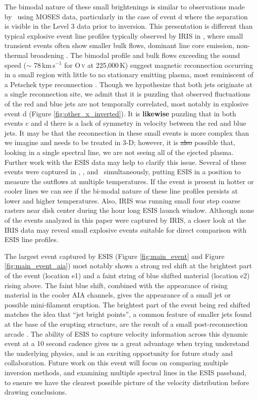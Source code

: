 \documentclass[linenumbers,trackchanges]{aastex63}
\begin{document}
	The bimodal nature of these small brightenings is similar to observations made by \citet{Rust2019} \heii \ using MOSES data, particularly in the case of event d where the separation is visible in the Level 3 data prior to inversion.
	This presentation is different than typical explosive event line profiles typically observed by IRIS in \siiv, where small transient events often show smaller bulk flows, dominant line core emission, non-thermal broadening \citep{Innes2015,Chitta2017}. 
	The bimodal profile and bulk flows exceeding the sound speed ($\sim$ 78\,km\,s$^{-1}$ for O\,\textsc{v} at 225,000\,K) suggest magnetic reconnection occurring in a small region with little to no stationary emitting plasma, most reminiscent of a Petschek type reconnection \citep{Innes1999}.
	Though we hypothesize that both jets originate at a single reconnection site, we admit that it is puzzling that observed fluctuations of the red and blue jets are not temporally correlated, most notably in explosive event d (Figure \ref{fig:other_x_inverted}).
    It is \textbf{likewise} puzzling that in both events c and d there is a lack of symmetry in velocity between the red and blue jets.
	It may be that the reconnection in these small events is more complex than we imagine and needs to be treated in 3-D; however, it is \sout{also} possible that, looking in a single spectral line, we are not seeing all of the ejected plasma. 
	Further work with the ESIS data may help to clarify this issue.
	Several of these events were captured in \hei, \mgxbright, and \ov \ simultaneously, putting ESIS in a position to measure the outflows at multiple temperatures. 
	If the event is present in hotter or cooler lines we can see if the bi-modal nature of these line profiles persists at lower and higher temperatures.
	Also, IRIS was running small four step coarse rasters near disk center during the hour long ESIS launch window.
	Although none of the events analyzed in this paper were captured by IRIS, a closer look at the IRIS data may reveal small explosive events suitable for direct comparison with ESIS line profiles.
	
	The largest event captured by ESIS (Figure \ref{fig:main_event} and Figure \ref{fig:main_event_aia}) most notably shows a strong red shift at the brightest part of the event (location e1) and a faint string of blue shifted material (location e2) rising above.
	The faint blue shift, combined with the appearance of rising material in the cooler AIA channels, gives the appearance of a small jet or possible mini-filament eruption.
	The brightest part of the event being red shifted matches the idea that ``jet bright points'', a common feature of smaller jets found at the base of the erupting structure, are the result of a small post-reconnection arcade \citep[see][and references therein]{Sterling2015}.
	The ability of ESIS to capture velocity information across this dynamic event at a 10 second cadence gives us a great advantage when trying understand the underlying physics, and is an exciting opportunity for future study and collaboration.
	Future work on this event will focus on comparing multiple inversion methods, and examining multiple spectral lines in the ESIS passband, to ensure we have the clearest possible picture of the velocity distribution before drawing conclusions.
	
\end{document}
